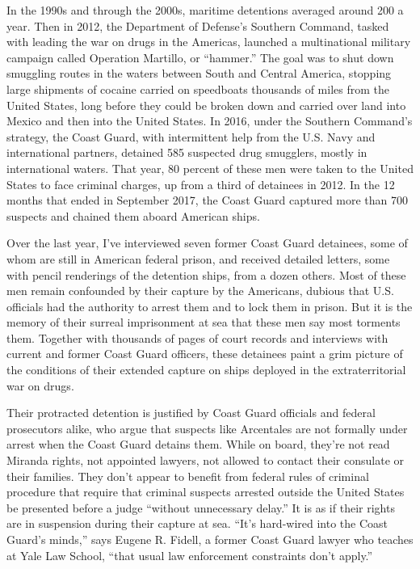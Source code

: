 In the 1990s and through the 2000s, maritime detentions averaged around
200 a year. Then in 2012, the Department of Defense's Southern Command,
tasked with leading the war on drugs in the Americas, launched a
multinational military campaign called Operation Martillo, or
``hammer.'' The goal was to shut down smuggling routes in the waters
between South and Central America, stopping large shipments of cocaine
carried on speedboats thousands of miles from the United States, long
before they could be broken down and carried over land into Mexico and
then into the United States. In 2016, under the Southern Command's
strategy, the Coast Guard, with intermittent help from the U.S. Navy and
international partners, detained 585 suspected drug smugglers, mostly in
international waters. That year, 80 percent of these men were taken to
the United States to face criminal charges, up from a third of detainees
in 2012. In the 12 months that ended in September 2017, the Coast Guard
captured more than 700 suspects and chained them aboard American ships.

Over the last year, I've interviewed seven former Coast Guard detainees,
some of whom are still in American federal prison, and received detailed
letters, some with pencil renderings of the detention ships, from a
dozen others. Most of these men remain confounded by their capture by
the Americans, dubious that U.S. officials had the authority to arrest
them and to lock them in prison. But it is the memory of their surreal
imprisonment at sea that these men say most torments them. Together with
thousands of pages of court records and interviews with current and
former Coast Guard officers, these detainees paint a grim picture of the
conditions of their extended capture on ships deployed in the
extraterritorial war on drugs.

Their protracted detention is justified by Coast Guard officials and
federal prosecutors alike, who argue that suspects like Arcentales are
not formally under arrest when the Coast Guard detains them. While on
board, they're not read Miranda rights, not appointed lawyers, not
allowed to contact their consulate or their families. They don't appear
to benefit from federal rules of criminal procedure that require that
criminal suspects arrested outside the United States be presented before
a judge ``without unnecessary delay.'' It is as if their rights are in
suspension during their capture at sea. ``It's hard-wired into the Coast
Guard's minds,'' says Eugene R. Fidell, a former Coast Guard lawyer who
teaches at Yale Law School, ``that usual law enforcement constraints
don't apply.''

